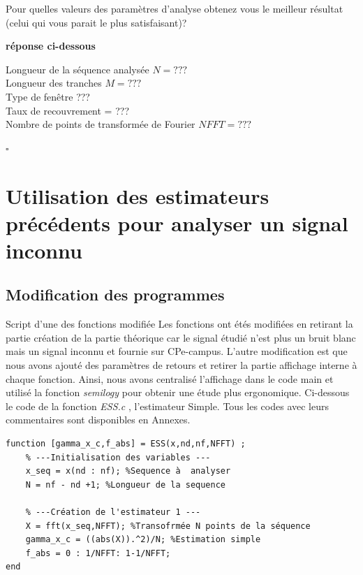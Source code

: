 \documentclass{article}
\newcommand{\debutrep}[1]{\color{blue}\begin{center} \hrulefill \textbf{ #1 } \hrulefill \end{center} }
\newcommand{\finrep}{\vspace*{5mm}\hfill $\square$\color{black}\vspace*{5mm}}
\begin{document}
Pour quelles valeurs des paramètres d'analyse obtenez vous le \og meilleur \fg résultat (celui qui vous parait le plus satisfaisant)?

\debutrep{réponse ci-dessous}

Longueur de la séquence analysée $N = ???$ \\
Longueur des tranches $M = ???$ \\
Type de fenêtre ??? \\
Taux de recouvrement = ??? \\
Nombre de points de transformée de Fourier $NFFT = ???$

\finrep

\section{Utilisation des estimateurs précédents pour analyser un signal inconnu}

\subsection{Modification des programmes}

Script d'une des fonctions modifiée
\newline
\newline
Les fonctions ont étés modifiées en retirant la partie création de la partie théorique car le signal étudié n'est plus un bruit blanc mais un signal inconnu et fournie sur CPe-campus.
\newline
L'autre modification est que nous avons ajouté des paramètres de retours et retirer la partie affichage interne à chaque fonction. Ainsi, nous avons centralisé l'affichage dans le code main et utilisé la fonction \textit{semilogy} pour obtenir une étude plus ergonomique. 
Ci-dessous le code de la fonction \textit{ESS.c }, l'estimateur Simple. Tous les codes avec leurs commentaires sont disponibles en Annexes. 

\begin{verbatim}
function [gamma_x_c,f_abs] = ESS(x,nd,nf,NFFT) ;
    % ---Initialisation des variables ---
    x_seq = x(nd : nf); %Sequence à  analyser
    N = nf - nd +1; %Longueur de la sequence
    
    % ---Création de l'estimateur 1 ---
    X = fft(x_seq,NFFT); %Transofrmée N points de la séquence  
    gamma_x_c = ((abs(X)).^2)/N; %Estimation simple
    f_abs = 0 : 1/NFFT: 1-1/NFFT;
end

\end{verbatim}
\end{document}
